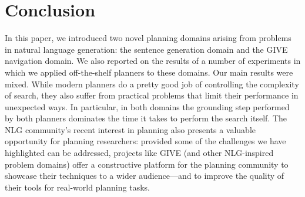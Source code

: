\section{Conclusion} \label{sec:conclusion}

In this paper, we introduced two novel planning domains arising from
problems in natural language generation: the sentence generation domain and
the GIVE navigation domain. We also reported on the results of a number of
experiments in which we applied off-the-shelf planners to these domains.
Our main results were mixed. While modern planners do a pretty good job of
controlling the complexity of search, they also suffer from practical
problems that limit their performance in unexpected ways. In particular,
in both domains the grounding step performed by both planners dominates the
time it takes to perform the search itself. The NLG community's recent
interest in planning also presents a valuable opportunity for planning
researchers: provided some of the challenges we have highlighted can be
addressed, projects like GIVE (and other NLG-inspired problem domains)
offer a constructive platform for the planning community to showcase their
techniques to a wider audience---and to improve the quality of their tools
for real-world planning tasks.




